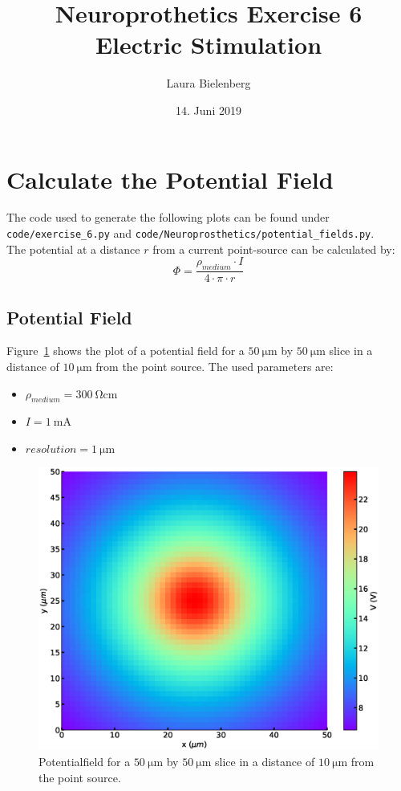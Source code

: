 \documentclass{scrartcl}			%
\title{Neuroprothetics Exercise 6\\Electric Stimulation}
\author{ Laura Bielenberg }
\date{14. Juni 2019}
\begin{document}

\maketitle

\section{Calculate the Potential Field}
The code used to generate the following plots can be found under \texttt{code/exercise\_6.py} and \texttt{code/Neuroprosthetics/potential\_fields.py}.\\
The potential at a distance $r$ from a current point-source can be calculated by:
\begin{equation}
\Phi = \frac{\rho_{medium}\cdot I}{4\cdot\pi\cdot r}
\end{equation}

\subsection{Potential Field}
Figure~\ref{fig:pot_field} shows the plot of a potential field for a $\SI{50}{\micro\meter}$ by $\SI{50}{\micro\meter}$ slice  in a distance of $\SI{10}{\micro\meter}$ from the point source. The used parameters are:
\begin{itemize}
\item $\rho_{medium} = \SI{300}{\ohm\cm}$
\item $I = \SI{1}{\milli\ampere}$
\item $resolution = \SI{1}{\micro\meter}$ 

\end{itemize}

\begin{figure}[H]
\centering
\includegraphics[width=\linewidth]{imgs/potentialfield.eps}
    \caption{Potentialfield for a $\SI{50}{\micro\meter}$ by $\SI{50}{\micro\meter}$ slice in a distance of $\SI{10}{\micro\meter}$ from the point source.} 
    \label{fig:pot_field} 
\end{figure}
\end{document}

